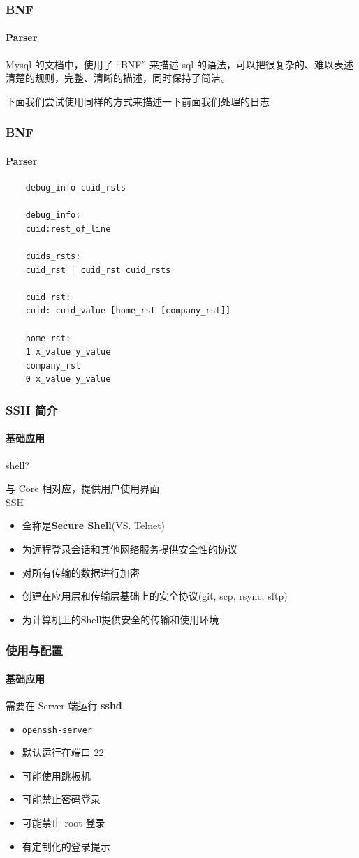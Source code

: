 \begin{frame}[fragile]
  \frametitle{BNF}
  \framesubtitle{Parser}

  Mysql 的文档中，使用了 “BNF” 来描述 sql 的语法，可以把很复杂的、难以表述清楚的规则，完整、清晰的描述，同时保持了简洁。

  \vspace{\baselineskip}

  下面我们尝试使用同样的方式来描述一下前面我们处理的日志
  
\end{frame}

\begin{frame}[fragile]
  \frametitle{BNF}
  \framesubtitle{Parser}
  \begin{verbatim}
    debug_info cuid_rsts

    debug_info:
    cuid:rest_of_line

    cuids_rsts:
    cuid_rst | cuid_rst cuid_rsts
    
    cuid_rst:
    cuid: cuid_value [home_rst [company_rst]]
    
    home_rst:
    1 x_value y_value
    company_rst
    0 x_value y_value
  \end{verbatim}
\end{frame}

\begin{frame}[fragile]
  \frametitle{SSH 简介}
  \framesubtitle{基础应用}
  shell? \pause

  与 Core 相对应，提供用户使用界面 \\ \pause
  \vspace{\baselineskip}
  SSH
  \begin{itemize}
  \item 全称是\textbf{Secure Shell}(VS. Telnet)
  \item 为远程登录会话和其他网络服务提供安全性的协议
  \item 对所有传输的数据进行加密
  \item 创建在应用层和传输层基础上的安全协议(git, scp, rsync, sftp)
  \item 为计算机上的Shell提供安全的传输和使用环境
  \end{itemize}
\end{frame}

\begin{frame}[fragile]
  \frametitle{使用与配置}
  \framesubtitle{基础应用}
  需要在 Server 端运行 \textbf{sshd}
  \begin{itemize}
  \item \verb|openssh-server|
  \item 默认运行在端口 22
  \item 可能使用跳板机
  \item 可能禁止密码登录
  \item 可能禁止 \textsf{root} 登录
  \item 有定制化的登录提示
  \end{itemize}
\end{frame}


